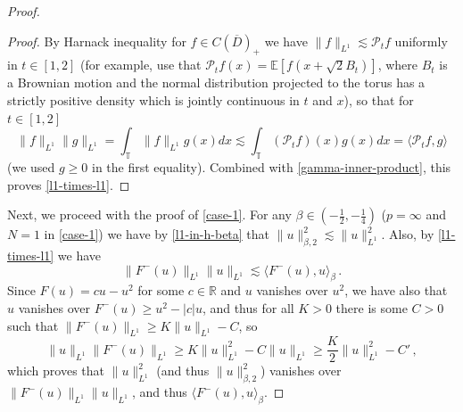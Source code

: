 \documentclass[final]{amsart}
\numberwithin{thm}{section}
\numberwithin{equation}{section}
\newcommand{\E}{\mathbb{E}}
\newcommand{\Pp}{\mathcal{P}}
\newcommand{\R}{\mathbb{R}}
\newcommand{\ip}[2]{\langle #1, #2 \rangle}
\newcommand{\T}{\mathbb{T}}
\newcommand{\cdom}{C(\overline D)_+}
\begin{document}
\begin{proof}
\begin{proof}
   By Harnack inequality for $f \in \cdom$ we have $\|f\|_{L^1} \lesssim \Pp_tf$ uniformly in $t \in [1,2]$ (for example, use  that $\Pp_tf(x) = \E[f(x + \sqrt{2}B_t)]$,  where $B_t$ is a Brownian motion and the normal distribution projected to the torus has a strictly positive density which is jointly continuous in $t$ and $x$), so that for $t \in [1,2]$
    $$\|f\|_{L^1}\|g\|_{L^1} = \int_\T \|f\|_{L^1}g(x) dx \lesssim \int_\T (\Pp_tf)(x)g(x) dx = \ip{\Pp_t f}{g}$$
    (we used $g \geq 0$ in the first equality). Combined with \eqref{gamma-inner-product}, this proves \ref{l1-times-l1}.
\end{proof}

Next, we proceed with the proof of \ref{case-1}. For any $\beta \in (-\frac{1}{2},-\frac{1}{4})$ ($p = \infty$ and $N = 1$ in \ref{case-1}) we have  by \ref{l1-in-h-beta} that $\|u\|_{\beta,2}^2 \lesssim \|u\|_{L^1}^2$. Also, by \ref{l1-times-l1} we have
$$\|F^-(u)\|_{L^1}\|u\|_{L^1} \lesssim \ip{F^-(u)}{u}_\beta \,.$$
Since $F(u) = cu - u^2$ for some $c \in \R$ and $u$ vanishes over $u^2$, we have also that $u$ vanishes over $F^-(u) \geq u^2 - |c|u$, and thus for all $K > 0$ there is some $C > 0$ such that $\|F^-(u)\|_{L^1} \geq K\|u\|_{L^1} - C$, so
$$\|u\|_{L^1}\|F^-(u)\|_{L^1} \geq K\|u\|_{L^1}^2 - C\|u\|_{L^1} \geq \frac{K}{2}\|u\|_{L^1}^2 - C' \,,$$
which proves that $\|u\|_{L^1}^2$ (and thus $\|u\|_{\beta,2}^2$) vanishes over $\|F^-(u)\|_{L^1}\|u\|_{L^1}$, and thus $\ip{F^-(u)}{u}_\beta$.




\end{proof}
\end{document}
